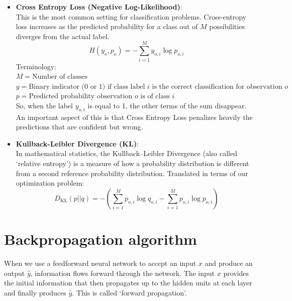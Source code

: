 \begin{itemize}
    \item \textbf{Cross Entropy Loss (Negative Log-Likelihood)}:\\
    This is the most common setting for classification problems. Cross-entropy loss increases as the predicted probability for a class out of $M$ possibilities diverges from the actual label.
    \begin{equation}
        H(y_o,p_o) = - \sum_{i=1}^{M} y_{o,i} \log{p_{o,i}}
    \end{equation}
    Terminology:\\
    $M = \text{Number of classes}$\\
    $y = \text{Binary indicator (0 or 1) if class label $i$ is the correct classification for observation $o$}$\\
    $p = \text{Predicted probability observation $o$ is of class $i$}$\\
    So, when the label $y_{o,i}$ is equal to 1, the other terms of the sum disappear. An important aspect of this is that Cross Entropy Loss penalizes heavily the predictions that are confident but wrong.
    
    \item \textbf{Kullback-Leibler Divergence (KL)}:\\
    In mathematical statistics, the Kullback–Leibler Divergence (also called `relative entropy') is a measure of how a probability distribution is different from a second reference probability distribution. Translated in terms of our optimization problem:
    \begin{equation}
        D_{\mathrm{KL}}(p||q) = - \left( \sum_{i=1}^{M} p_{o,i} \log{q_{o,i}} - \sum_{i=1}^{M} p_{o,i} \log{p_{o,i}} \right)
    \end{equation}
\end{itemize}





\section{Backpropagation algorithm}
When we use a feedforward neural network to accept an input $x$ and produce an output $\hat{y}$, information flows forward through the network. The input $x$ provides the initial information that then propagates up to the hidden units at each layer and finally produces $\hat{y}$. This is called `forward propagation'. 

